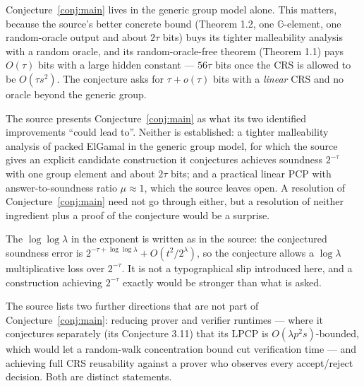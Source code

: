 \documentclass{aicr-conjecture}
\newcommand{\G}{\mathbb{G}}
\begin{document}
\begin{remark}
Conjecture~\ref{conj:main} lives in the generic group model alone. This
matters, because the source's better concrete bound (Theorem 1.2, one
$\G$-element, one random-oracle output and about $2\tau$ bits) buys its
tighter malleability analysis with a random oracle, and its
random-oracle-free theorem (Theorem 1.1) pays $O(\tau)$ bits with a large
hidden constant --- $56\tau$ bits once the CRS is allowed to be
$O(\tau s^{2})$. The conjecture asks for $\tau + o(\tau)$ bits with a
\emph{linear} CRS and no oracle beyond the generic group.
\end{remark}

\begin{remark}
The source presents Conjecture~\ref{conj:main} as what its two identified
improvements ``could lead to''. Neither is established: a tighter
malleability analysis of packed ElGamal in the generic group model, for
which the source gives an explicit candidate construction it conjectures
achieves soundness $2^{-\tau}$ with one group element and about $2\tau$
bits; and a practical linear PCP with answer-to-soundness ratio $\mu
\approx 1$, which the source leaves open. A resolution of
Conjecture~\ref{conj:main} need not go through either, but a resolution
of neither ingredient plus a proof of the conjecture would be a
surprise.
\end{remark}

\begin{remark}
The $\log\log\lambda$ in the exponent is written as in the source: the
conjectured soundness error is $2^{-\tau + \log\log\lambda} + O(t^{2} /
2^{\lambda})$, so the conjecture allows a $\log\lambda$ multiplicative
loss over $2^{-\tau}$. It is not a typographical slip introduced here,
and a construction achieving $2^{-\tau}$ exactly would be stronger than
what is asked.
\end{remark}

\begin{remark}
The source lists two further directions that are not part of
Conjecture~\ref{conj:main}: reducing prover and verifier runtimes ---
where it conjectures separately (its Conjecture 3.11) that its LPCP is
$O(\lambda p^{2} s)$-bounded, which would let a random-walk concentration
bound cut verification time --- and achieving full CRS reusability
against a prover who observes every accept/reject decision. Both are
distinct statements.
\end{remark}
\end{document}
